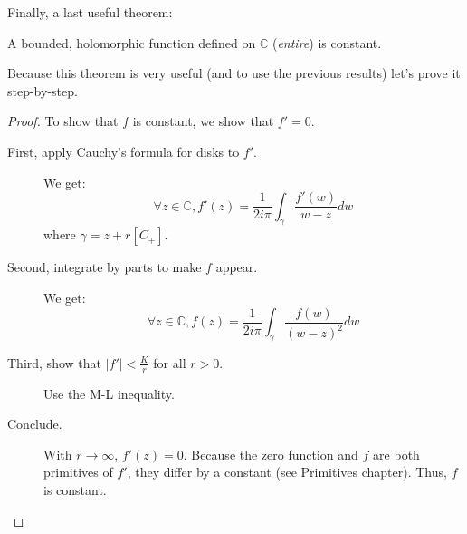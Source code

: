 Finally, a last useful theorem:

\begin{thm*}
    A bounded, holomorphic function defined on $\mathbb{C}$ (\emph{entire}) is constant.
\end{thm*}

Because this theorem is very useful (and to use the previous results) let's prove it step-by-step.

\begin{proof}
    To show that $f$ is constant, we show that $f' = 0$.
    \begin{description}
        \item[First, apply Cauchy's formula for disks to $f'$.]
            We get:
            $$ \forall z\in\mathbb{C}, f'(z) = \frac{1}{2i\pi} \int_\gamma\frac{f'(w)}{w-z}dw$$
            where $\gamma = z + r[C_+]$.
        \item[Second, integrate by parts to make $f$ appear.]
            We get:
            $$ \forall z\in\mathbb{C}, f(z) = \frac{1}{2i\pi} \int_\gamma\frac{f(w)}{(w-z)^2}dw$$
        \item[Third, show that $|f'| < \frac{K}{r}$ for all $r > 0$.] Use the M-L inequality.
        \item[Conclude.] With $r\rightarrow \infty$, $f'(z) = 0$. Because the zero function and $f$ are both primitives of $f'$, they differ by a constant (see Primitives chapter). Thus, $f$ is constant.
    \end{description}
\end{proof}

